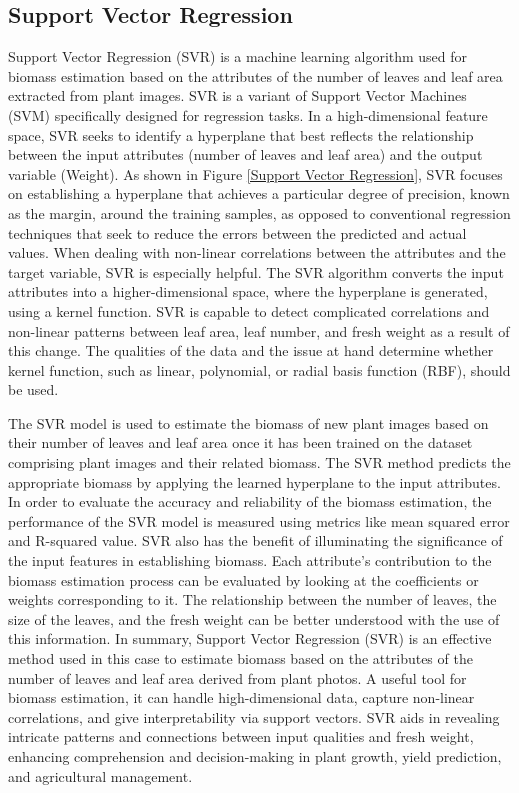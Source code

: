 \documentclass[a4paper,12pt]{report}%
\renewcommand{\\}{\vspace*{0.5\baselineskip} \newline}
\begin{document}
\subsection{Support Vector Regression}
Support Vector Regression (SVR) is a machine learning algorithm used for biomass estimation based on the attributes of the number of leaves and leaf area extracted from plant images. SVR is a variant of Support Vector Machines (SVM) specifically designed for regression tasks.
In a high-dimensional feature space, SVR seeks to identify a hyperplane that best reflects the relationship between the input attributes (number of leaves and leaf area) and the output variable (Weight). As shown in Figure \ref{Support Vector Regression}, SVR focuses on establishing a hyperplane that achieves a particular degree of precision, known as the margin, around the training samples, as opposed to conventional regression techniques that seek to reduce the errors between the predicted and actual values. When dealing with non-linear correlations between the attributes and the target variable, SVR is especially helpful.
The SVR algorithm converts the input attributes into a higher-dimensional space, where the hyperplane is generated, using a kernel function. SVR is capable to detect complicated correlations and non-linear patterns between leaf area, leaf number, and fresh weight as a result of this change. The qualities of the data and the issue at hand determine whether kernel function, such as linear, polynomial, or radial basis function (RBF), should be used.

\noindent The SVR model is used to estimate the biomass of new plant images based on their number of leaves and leaf area once it has been trained on the dataset comprising plant images and their related biomass. The SVR method predicts the appropriate biomass by applying the learned hyperplane to the input attributes.
In order to evaluate the accuracy and reliability of the biomass estimation, the performance of the SVR model is measured using metrics like mean squared error and R-squared value.
SVR also has the benefit of illuminating the significance of the input features in establishing biomass. Each attribute's contribution to the biomass estimation process can be evaluated by looking at the coefficients or weights corresponding to it. The relationship between the number of leaves, the size of the leaves, and the fresh weight can be better understood with the use of this information.
In summary, Support Vector Regression (SVR) is an effective method used in this case to estimate biomass based on the attributes of the number of leaves and leaf area derived from plant photos. A useful tool for biomass estimation, it can handle high-dimensional data, capture non-linear correlations, and give interpretability via support vectors. SVR aids in revealing intricate patterns and connections between input qualities and fresh weight, enhancing comprehension and decision-making in plant growth, yield prediction, and agricultural management.
\end{document}
